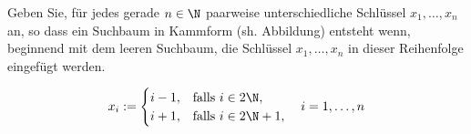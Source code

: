 
\begin{exercise}

Geben Sie, für jedes gerade $n \in \N$ paarweise unterschiedliche Schlüssel $x_1, \dots, x_n$ an, so dass ein Suchbaum in Kammform (sh. Abbildung) entsteht wenn, beginnend mit dem leeren Suchbaum, die Schlüssel $x_1, \dots, x_n$ in dieser Reihenfolge eingefügt werden.

\end{exercise}


\begin{solution}

\phantom{}


\begin{center}
  
\end{center}

\begin{align*}
  x_i
  :=
  \begin{cases}
  i - 1, & \text{falls}~ i \in 2\N, \\
  i + 1, & \text{falls}~ i \in 2\N + 1,
  \end{cases}
  \quad
  i = 1, \dots, n
\end{align*}

\end{solution}

